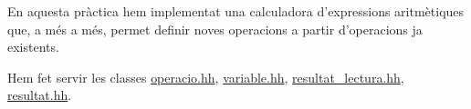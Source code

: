 En aquesta pràctica hem implementat una calculadora d’expressions aritmètiques que, a més a més, permet definir noves operacions a partir d’operacions ja existents.

Hem fet servir les classes \hyperlink{operacio_8hh_source}{operacio.\+hh}, \hyperlink{variable_8hh_source}{variable.\+hh}, \hyperlink{resultat__lectura_8hh_source}{resultat\+\_\+lectura.\+hh}, \hyperlink{resultat_8hh_source}{resultat.\+hh}. 